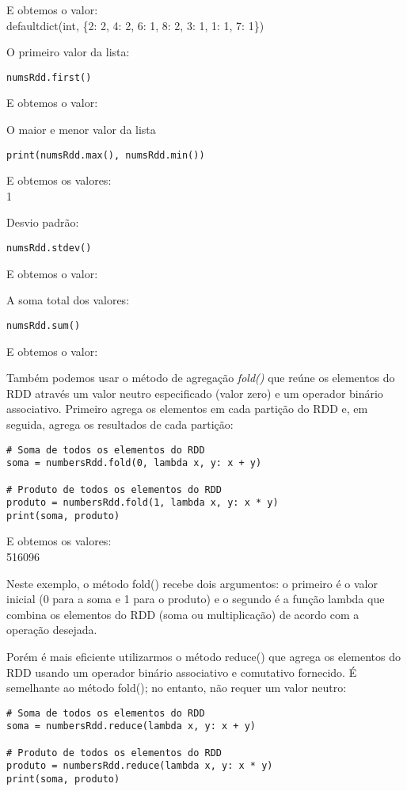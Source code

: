 E obtemos o valor: \\
{\ttfamily defaultdict(int, \{2: 2, 4: 2, 6: 1, 8: 2, 3: 1, 1: 1, 7: 1\})}

O primeiro valor da lista:
\begin{lstlisting}[]
numsRdd.first()
\end{lstlisting}

E obtemos o valor: \\
{}

O maior e menor valor da lista
\begin{lstlisting}[]
print(numsRdd.max(), numsRdd.min())
\end{lstlisting}

E obtemos os valores: \\
{ 1}

Desvio padrão:
\begin{lstlisting}[]
numsRdd.stdev()
\end{lstlisting}

E obtemos o valor: \\
{}

A soma total dos valores:
\begin{lstlisting}[]
numsRdd.sum()
\end{lstlisting}

E obtemos o valor: \\
{}

Também podemos usar o método de agregação \textit{fold()} que reúne os elementos do RDD através um valor neutro especificado (valor zero) e um operador binário associativo. Primeiro agrega os elementos em cada partição do RDD e, em seguida, agrega os resultados de cada partição:
\begin{lstlisting}[]
# Soma de todos os elementos do RDD
soma = numbersRdd.fold(0, lambda x, y: x + y)

# Produto de todos os elementos do RDD
produto = numbersRdd.fold(1, lambda x, y: x * y)
print(soma, produto)
\end{lstlisting}

E obtemos os valores: \\
{ 516096}

Neste exemplo, o método fold() recebe dois argumentos: o primeiro é o valor inicial (0 para a soma e 1 para o produto) e o segundo é a função lambda que combina os elementos do RDD (soma ou multiplicação) de acordo com a operação desejada.

Porém é mais eficiente utilizarmos o método reduce() que agrega os elementos do RDD usando um operador binário associativo e comutativo fornecido. É semelhante ao método fold(); no entanto, não requer um valor neutro:
\begin{lstlisting}[]
# Soma de todos os elementos do RDD
soma = numbersRdd.reduce(lambda x, y: x + y)

# Produto de todos os elementos do RDD
produto = numbersRdd.reduce(lambda x, y: x * y)
print(soma, produto)
\end{lstlisting}

